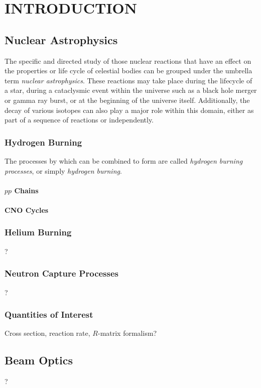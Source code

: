 \chapter{INTRODUCTION}

\section{Nuclear Astrophysics}

The specific and directed study of those nuclear reactions that have an effect
on the properties or life cycle of celestial bodies can be grouped under the
umbrella term \emph{nuclear astrophysics}. These reactions may take place
during the lifecycle of a star, during a cataclysmic event within the universe
such as a black hole merger or gamma ray burst, or at the beginning of the
universe itself. Additionally, the decay of various isotopes can also play a
major role within this domain, either as part of a sequence of reactions or
independently.

\subsection{Hydrogen Burning}

The processes by which  can be combined to form  are
called \emph{hydrogen burning processes}, or simply \emph{hydrogen burning}.

\subsubsection{$pp$ Chains}
\subsubsection{CNO Cycles}
\subsection{Helium Burning}
?
\subsection{Neutron Capture Processes}
?
\subsection{Quantities of Interest}
Cross section, reaction rate, $R$-matrix formalism?


\section{Beam Optics}
?

